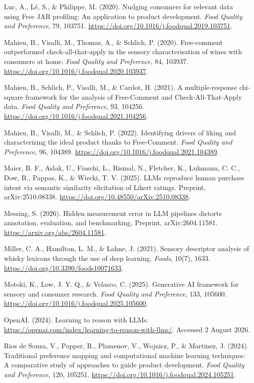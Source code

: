 \documentclass[11pt]{article}
\begin{document}
\noindent Luc, A., L\^e, S., \& Philippe, M. (2020). Nudging consumers for
relevant data using Free JAR profiling: An application to product development.
\emph{Food Quality and Preference}, 79, 103751.
\url{https://doi.org/10.1016/j.foodqual.2019.103751}.

\noindent Mahieu, B., Visalli, M., Thomas, A., \& Schlich, P. (2020).
Free-comment outperformed check-all-that-apply in the sensory characterisation
of wines with consumers at home. \emph{Food Quality and Preference}, 84, 103937.
\url{https://doi.org/10.1016/j.foodqual.2020.103937}.

\noindent Mahieu, B., Schlich, P., Visalli, M., \& Cardot, H. (2021). A
multiple-response chi-square framework for the analysis of Free-Comment and
Check-All-That-Apply data. \emph{Food Quality and Preference}, 93, 104256.
\url{https://doi.org/10.1016/j.foodqual.2021.104256}.

\noindent Mahieu, B., Visalli, M., \& Schlich, P. (2022). Identifying drivers
of liking and characterizing the ideal product thanks to Free-Comment.
\emph{Food Quality and Preference}, 96, 104389.
\url{https://doi.org/10.1016/j.foodqual.2021.104389}.

\noindent Maier, B. F., Aslak, U., Fiaschi, L., Rismal, N., Fletcher, K.,
Luhmann, C. C., Dow, R., Pappas, K., \& Wiecki, T. V. (2025). LLMs reproduce
human purchase intent via semantic similarity elicitation of Likert ratings.
Preprint, arXiv:2510.08338.
\url{https://doi.org/10.48550/arXiv.2510.08338}.

\noindent Messing, S. (2026). Hidden measurement error in LLM pipelines
distorts annotation, evaluation, and benchmarking. Preprint, arXiv:2604.11581.
\url{https://arxiv.org/abs/2604.11581}.

\noindent Miller, C. A., Hamilton, L. M., \& Lahne, J. (2021). Sensory
descriptor analysis of whisky lexicons through the use of deep learning.
\emph{Foods}, 10(7), 1633. \url{https://doi.org/10.3390/foods10071633}.

\noindent Motoki, K., Low, J. Y. Q., \& Velasco, C. (2025). Generative AI
framework for sensory and consumer research. \emph{Food Quality and Preference},
133, 105600. \url{https://doi.org/10.1016/j.foodqual.2025.105600}.

\noindent OpenAI. (2024). Learning to reason with LLMs.
\url{https://openai.com/index/learning-to-reason-with-llms/}. Accessed
2 August 2026.

\noindent Rios de Souza, V., Popper, R., Plamenov, V., Wojnicz, P., \& Martinez,
J. (2024). Traditional preference mapping and computational machine learning
techniques: A comparative study of approaches to guide product development.
\emph{Food Quality and Preference}, 120, 105251.
\url{https://doi.org/10.1016/j.foodqual.2024.105251}.
\end{document}

